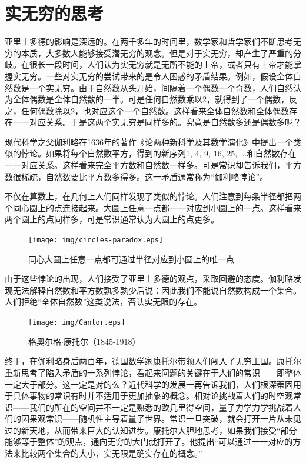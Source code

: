 \documentclass{article}
\begin{document}
\section{实无穷的思考}
亚里士多德的影响是深远的。在两千多年的时间里，数学家和哲学家们不断思考无穷的本质，大多数人能够接受潜无穷的观念。但是对于实无穷，却产生了严重的分歧。在很长一段时间，人们认为实无穷就是无所不能的上帝，或者只有上帝才能掌握实无穷。一些对实无穷的尝试带来的是令人困惑的矛盾结果。例如，假设全体自然数是一个实无穷。由于自然数从头开始，间隔着一个偶数一个奇数，人们自然认为全体偶数是全体自然数的一半。可是任何自然数乘以2，就得到了一个偶数，反之，任何偶数除以2，也对应这个一个自然数。这样看来全体自然数和全体偶数存在一一对应关系。于是这两个实无穷是同样多的。究竟是自然数多还是偶数多呢？

现代科学之父伽利略在1636年的著作《论两种新科学及其数学演化》中提出一个类似的悖论。如果将每个自然数平方，得到的新序列1, 4, 9, 16, 25, ...和自然数存在一一对应关系。这样看来完全平方数和自然数一样多。可是常识却告诉我们，平方数很稀疏，自然数要比平方数多得多。这一矛盾通常称为“伽利略悖论”。

不仅在算数上，在几何上人们同样发现了类似的悖论。人们注意到每条半径都把两个同心圆上的点连接起来。大圆上任意一点都一一对应到小圆上的一点。这样看来两个圆上的点同样多，可是常识通常认为大圆上的点更多。

\begin{figure}[htbp]
 \centering
 \texttt{[image: img/circles-paradox.eps]}
 \caption{同心大圆上任意一点都可通过半径对应到小圆上的唯一点}
 \label{fig:circles-paradox}
\end{figure}

由于这些悖论的出现，人们接受了亚里士多德的观点，采取回避的态度。伽利略发现无法解释自然数和平方数孰多孰少后说：因此我们不能说自然数构成一个集合。人们拒绝“全体自然数”这类说法，否认实无限的存在。

\begin{figure}
 \centering
 \texttt{[image: img/Cantor.eps]}
 \captionsetup{labelformat=empty}
 \caption{格奥尔格$\cdot$康托尔（1845-1918）}
 \label{fig:Cantor}
\end{figure}

终于，在伽利略身后两百年，德国数学家康托尔带领人们闯入了无穷王国。康托尔重新思考了陷入矛盾的一系列悖论，看起来问题的关键在于人们的常识——即整体一定大于部分。这一定是对的么？近代科学的发展一再告诉我们，人们根深蒂固用于具体事物的常识有时并不适用于更加抽象的概念。相对论挑战着人们的时空观常识——我们的所在的空间并不一定是熟悉的欧几里得空间，量子力学力学挑战着人们的因果观常识——随机性主导着量子世界。常识一旦突破，就会打开一片从未见过的新天地，从而带来巨大的认知进步。康托尔大胆地思考，如果我们接受“部分能够等于整体”的观点，通向无穷的大门就打开了。他提出“可以通过一一对应的方法来比较两个集合的大小，实无限是确实存在的概念。”
\end{document}
